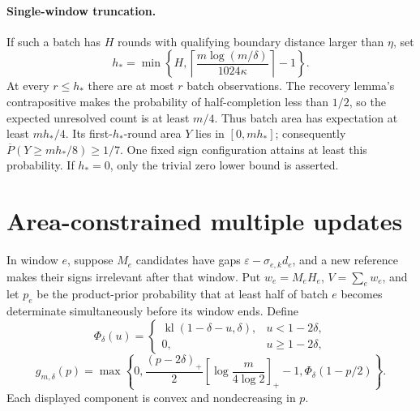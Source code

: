 \paragraph{Single-window truncation.}
If such a batch has $H$ rounds with qualifying boundary distance larger than
$\eta$, set
\[
 h_* =\min\left\{H,
 \left\lceil\frac{m\log(m/\delta)}{1024\kappa}\right\rceil-1\right\}.
\]
At every $r\le h_*$ there are at most $r$ batch observations. The recovery
lemma's contrapositive makes the probability of half-completion less than
$1/2$, so the expected unresolved count is at least $m/4$. Thus batch area
has expectation at least $mh_*/4$. Its first-$h_*$-round area $Y$ lies in
$[0,mh_*]$; consequently
$\overline P(Y\ge mh_*/8)\ge1/7$. One fixed sign configuration attains
at least this probability. If $h_*=0$, only the trivial zero lower bound is
asserted.

\section{Area-constrained multiple updates}
\label{app:area_lower}

In window $e$, suppose $M_e$ candidates have gaps
$\varepsilon-\sigma_{e,k}d_e$, and a new reference makes their signs
irrelevant after that window. Put $w_e=M_eH_e$, $V=\sum_ew_e$, and let
$p_e$ be the product-prior probability that at least half of batch $e$ becomes
determinate simultaneously before its window ends. Define
\[
 \Phi_\delta(u)=
 \begin{cases}
  \operatorname{kl}(1-\delta-u,\delta),&u<1-2\delta,\\
  0,&u\ge1-2\delta,
 \end{cases}
\]
\[
 g_{m,\delta}(p)=\max\left\{0,
 \frac{(p-2\delta)_+}{2}
       \left[\log\frac m{4\log2}\right]_+-1,
 \Phi_\delta(1-p/2)\right\}.
\]
Each displayed component is convex and nondecreasing in $p$.

